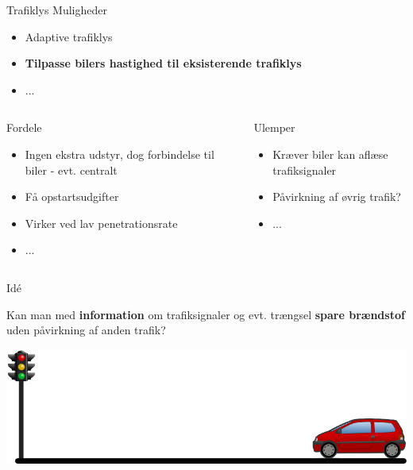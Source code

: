 \begin{frame}{Trafiklys}
Muligheder
\begin{itemize}
\item Adaptive trafiklys
\item \textbf{Tilpasse bilers hastighed til eksisterende trafiklys}
\item ...
\end{itemize}


\begin{center}
\begin{columns}
\begin{column}{0.5\textwidth}
Fordele
\begin{itemize}
\item Ingen ekstra udstyr, dog forbindelse til biler - evt. centralt
\item Få opstartsudgifter 
\item Virker ved lav penetrationsrate
\item ...
\end{itemize}
\end{column}

\begin{column}{0.5\textwidth}
Ulemper
\begin{itemize}
\item Kræver biler kan aflæse trafiksignaler
\item Påvirkning af øvrig trafik?
\item ...
\end{itemize}
\end{column}
\end{columns}
\end{center}
\end{frame}

\begin{frame}{Idé}
\begin{center}
Kan man med \textbf{information} om trafiksignaler og evt. trængsel \textbf{spare brændstof} uden påvirkning af anden trafik?
\end{center}
\includegraphics[width=1\textwidth]{images/figure.png}
\end{frame}




